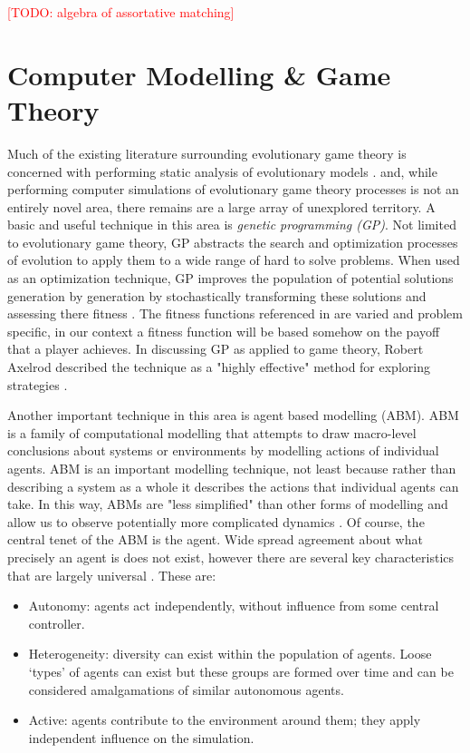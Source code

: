 \documentclass[11pt]{book}
\newcommand{\todo}[1]{\textcolor{red}{[TODO: #1]}\PackageWarning{TODO:}{#1!}}
\newcommand*{\np}{\par\noindent\newline}
\begin{document}
\todo{algebra of assortative matching}

\section{Computer Modelling \& Game Theory}\label{agent}
Much of the existing literature surrounding evolutionary game theory is concerned with performing static analysis of
evolutionary models \citep{alger_homo_2013,hetzer_evolutionary_2013,newton_preferences_2017}. and, while performing
computer simulations of evolutionary game theory processes is not an entirely novel area, there remains are a large
array of unexplored territory. A basic and useful technique in this area is \textit{genetic programming (GP)}. Not
limited to evolutionary game theory, GP abstracts the search and optimization processes of evolution to apply them to a
wide range of hard to solve problems. When used as an optimization technique, GP improves the population of potential
solutions generation by generation by stochastically transforming these solutions and assessing there fitness
\citep{poli_field_2008}. The fitness functions referenced in \citet{poli_field_2008} are varied and problem specific, in
our context a fitness function will be based somehow on the payoff that a player achieves. In discussing GP as applied
to game theory, Robert Axelrod described the technique as a "highly effective" method for exploring strategies \cite[p.
~23]{axelrod_effective_1980}. 

\np Another important technique in this area is agent based modelling (ABM). ABM is a family of computational modelling
that attempts to draw macro-level conclusions about systems or environments by modelling actions of individual agents.
ABM is an important modelling technique, not least because rather than describing a system as a whole it describes the
actions that individual agents can take. In this way, ABMs are "less simplified" than other forms of modelling and allow
us to observe potentially more complicated dynamics \cite[p. ~25]{railsback_agent-based_2011}. Of course, the central
tenet of the ABM is the agent. Wide spread agreement about what precisely an agent is does not exist, however there are
several key characteristics that are largely universal \citep{heppenstall_introduction_2012}. These are: 
\begin{itemize}
	\item Autonomy: agents act independently, without influence from some central controller.
	\item Heterogeneity: diversity can exist within the population of agents. Loose `types' of agents can exist but
	these groups are formed over time and can be considered amalgamations of similar autonomous agents.
	\item Active: agents contribute to the environment around them; they apply independent influence on the simulation.
\end{itemize}
\citep{heppenstall_introduction_2012}
\end{document}
